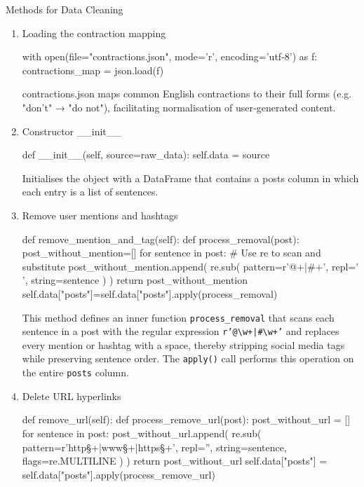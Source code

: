 \documentclass[12pt]{article}
\numberwithin{figure}{section}  %
\begin{document}
Methods for Data Cleaning 
\begin{enumerate}
\item Loading the contraction mapping
\begin{python}
with open(file="contractions.json", mode='r', encoding='utf-8') as f:
    contractions_map = json.load(f)

\end{python}
contractions.json maps common English contractions to their full forms (e.g. "don't" → "do not"), facilitating normalisation of user‑generated content.
\item Constructor \_\_init\_\_
\begin{python}
def __init__(self, source=raw_data):
    self.data = source

\end{python}
Initialises the object with a DataFrame that contains a posts column in which each entry is a list of sentences.
\item Remove user mentions and hashtags
\begin{python}
def remove_mention_and_tag(self):
    def process_removal(post):
        post_without_mention=[]
        for sentence in post:
            # Use re to scan and substitute
            post_without_mention.append(
                re.sub(
                    pattern=r'@\w+|#\w+',
                    repl=' ',
                    string=sentence
                )
            )
        return post_without_mention
    self.data["posts"]=self.data["posts"].apply(process_removal)

\end{python}
This method defines an inner function \texttt{process\_removal} that scans each sentence in a post with the regular expression \texttt{r'@\textbackslash w+|\#\textbackslash w+'} and replaces every mention or hashtag with a space, thereby stripping social media tags while preserving sentence order. The \texttt{apply()} call performs this operation on the entire \texttt{posts} column.

\item Delete URL hyperlinks
\begin{python}
def remove_url(self):
    def process_remove_url(post):
        post_without_url = []
        for sentence in post:
            post_without_url.append(
                re.sub(
                    pattern=r'http\S+|www\S+|https\S+',
                    repl='',
                    string=sentence,
                    flags=re.MULTILINE
                )
            )
        return post_without_url
    self.data["posts"] = self.data["posts"].apply(process_remove_url)


\end{python}
\end{enumerate}
\end{document}
